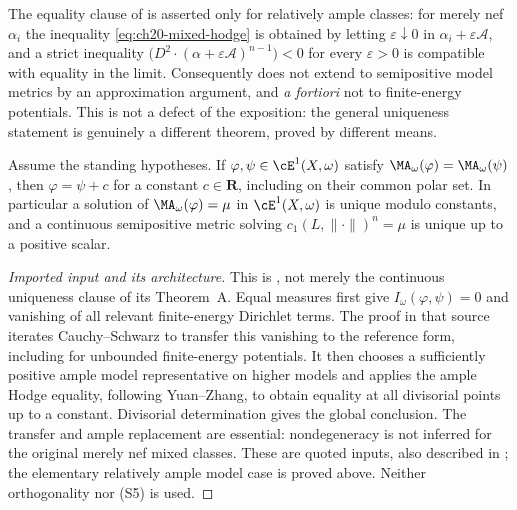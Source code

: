 \begin{remark}
\label{rem:ch29-ample-not-approximable}
The equality clause of  is asserted only for
relatively ample classes: for merely nef $\alpha_i$ the inequality
\eqref{eq:ch20-mixed-hodge} is obtained by letting
$\varepsilon\downarrow0$ in
$\alpha_i+\varepsilon\mathcal A$, and a strict inequality
$\bigl(D^2\cdot(\alpha+\varepsilon\mathcal A)^{n-1}\bigr)<0$ for every
$\varepsilon>0$ is compatible with equality in the limit.  Consequently
 does not extend to semipositive model
metrics by an approximation argument, and \emph{a fortiori} not to
finite-energy potentials.  This is not a defect of the exposition: the
general uniqueness statement is genuinely a different theorem, proved by
different means.
\end{remark}

\begin{theorem}
\label{thm:ch29-uniqueness}
Assume the standing hypotheses.  If
$\varphi,\psi\in\cE^1(X,\omega)$ satisfy
$\MA_\omega(\varphi)=\MA_\omega(\psi)$, then
$\varphi=\psi+c$ for a constant $c\in\mathbf R$, including on their
common polar set.  In particular a solution of $\MA_\omega(\varphi)=\mu$ in
$\cE^1(X,\omega)$ is unique modulo constants, and a continuous
semipositive metric solving $c_1(L,\lVert\cdot\rVert)^n=\mu$ is unique up
to a positive scalar.
\end{theorem}

\begin{proof}[Imported input and its architecture]
This is \cite[Proposition~8.2]{BFJ15}, not merely the continuous
uniqueness clause of its Theorem~A.  Equal measures first give
$I_\omega(\varphi,\psi)=0$ and vanishing of all relevant finite-energy
Dirichlet terms.  The proof in that source iterates Cauchy--Schwarz to
transfer this vanishing to the reference form, including for unbounded
finite-energy potentials.  It then chooses a sufficiently positive ample
model representative on higher models and applies the ample Hodge
equality, following Yuan--Zhang, to obtain equality at all divisorial
points up to a constant.  Divisorial determination gives the global
conclusion.  The transfer and ample replacement are essential:
nondegeneracy is not inferred for the original merely nef mixed classes.
These are quoted inputs, also described in
; the elementary relatively ample
model case is proved above.  Neither orthogonality nor \textup{(S5)}
is used.
\end{proof}

